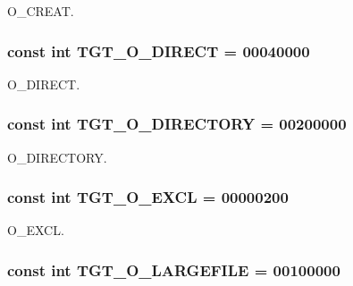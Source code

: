 O\_\-CREAT. \hypertarget{classArmLinux32_ae5d685a6a2ee8c6fe0ede370f0bec588}{
\subsubsection[{TGT\_\-O\_\-DIRECT}]{\setlength{\rightskip}{0pt plus 5cm}const int {\bf TGT\_\-O\_\-DIRECT} = 00040000}}
\label{classArmLinux32_ae5d685a6a2ee8c6fe0ede370f0bec588}


O\_\-DIRECT. \hypertarget{classArmLinux32_a1f10d158ad65ad6389078ba44629788a}{
\subsubsection[{TGT\_\-O\_\-DIRECTORY}]{\setlength{\rightskip}{0pt plus 5cm}const int {\bf TGT\_\-O\_\-DIRECTORY} = 00200000}}
\label{classArmLinux32_a1f10d158ad65ad6389078ba44629788a}


O\_\-DIRECTORY. \hypertarget{classArmLinux32_a10d5d118d15b51ebdd4b16dc78342d1d}{
\subsubsection[{TGT\_\-O\_\-EXCL}]{\setlength{\rightskip}{0pt plus 5cm}const int {\bf TGT\_\-O\_\-EXCL} = 00000200}}
\label{classArmLinux32_a10d5d118d15b51ebdd4b16dc78342d1d}


O\_\-EXCL. \hypertarget{classArmLinux32_a9600e092a6309f94d92129ce5f85b945}{
\subsubsection[{TGT\_\-O\_\-LARGEFILE}]{\setlength{\rightskip}{0pt plus 5cm}const int {\bf TGT\_\-O\_\-LARGEFILE} = 00100000}}
\label{classArmLinux32_a9600e092a6309f94d92129ce5f85b945}


